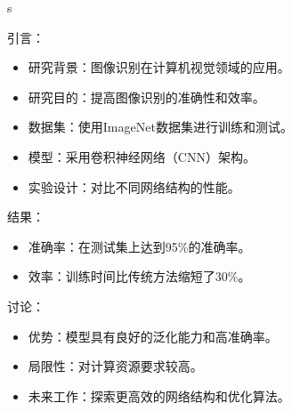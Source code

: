 \begin{gptbox}
s \footnotesize{
引言：
    \begin{itemize}
        \item {研究背景：图像识别在计算机视觉领域的应用。}
        \item {研究目的：提高图像识别的准确性和效率。}
    \end{itemize}
    
    \begin{itemize}
        \item {数据集：使用ImageNet数据集进行训练和测试。}
        \item {模型：采用卷积神经网络（CNN）架构。}
        \item {实验设计：对比不同网络结构的性能。}
    \end{itemize}
结果：
    \begin{itemize}
        \item {准确率：在测试集上达到95\%的准确率。}
        \item {效率：训练时间比传统方法缩短了30\%。}
    \end{itemize}
讨论：
    \begin{itemize}
        \item {优势：模型具有良好的泛化能力和高准确率。}
        \item {局限性：对计算资源要求较高。}
        \item {未来工作：探索更高效的网络结构和优化算法。}
    \end{itemize}
}
\end{gptbox}

